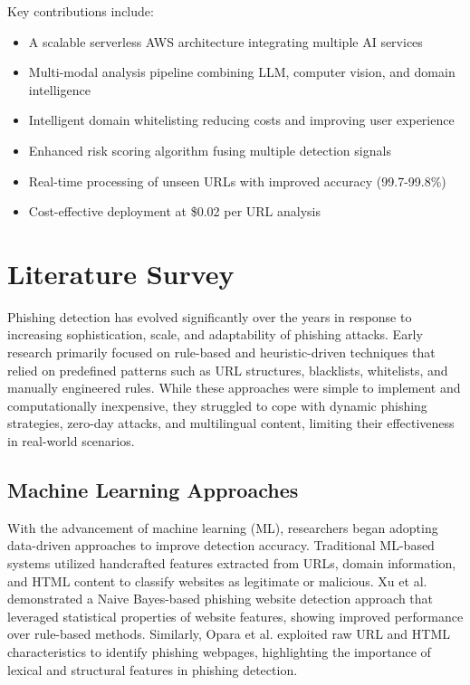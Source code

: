 \documentclass[conference]{IEEEtran}
\begin{document}
Key contributions include:
\begin{itemize}
\item A scalable serverless AWS architecture integrating multiple AI services
\item Multi-modal analysis pipeline combining LLM, computer vision, and domain intelligence
\item Intelligent domain whitelisting reducing costs and improving user experience
\item Enhanced risk scoring algorithm fusing multiple detection signals
\item Real-time processing of unseen URLs with improved accuracy (99.7-99.8\%)
\item Cost-effective deployment at \$0.02 per URL analysis
\end{itemize}


\section{Literature Survey}

Phishing detection has evolved significantly over the years in response to increasing sophistication, scale, and adaptability of phishing attacks. Early research primarily focused on rule-based and heuristic-driven techniques that relied on predefined patterns such as URL structures, blacklists, whitelists, and manually engineered rules. While these approaches were simple to implement and computationally inexpensive, they struggled to cope with dynamic phishing strategies, zero-day attacks, and multilingual content, limiting their effectiveness in real-world scenarios.

\subsection{Machine Learning Approaches}

With the advancement of machine learning (ML), researchers began adopting data-driven approaches to improve detection accuracy. Traditional ML-based systems utilized handcrafted features extracted from URLs, domain information, and HTML content to classify websites as legitimate or malicious. Xu et al. \cite{xu2022phishing} demonstrated a Naive Bayes-based phishing website detection approach that leveraged statistical properties of website features, showing improved performance over rule-based methods. Similarly, Opara et al. \cite{opara2024look} exploited raw URL and HTML characteristics to identify phishing webpages, highlighting the importance of lexical and structural features in phishing detection.
\end{document}
